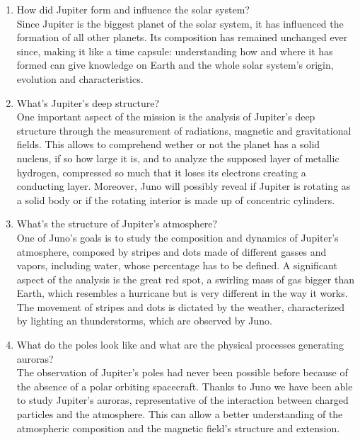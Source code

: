 \begin{enumerate}
    \item How did Jupiter form and influence the solar system? \\
    Since Jupiter is the biggest planet of the solar system, it has influenced the formation of all other planets. Its composition has remained unchanged ever since, making it like a time capsule: understanding how and where it has formed can give knowledge on Earth and the whole solar system’s origin, evolution and characteristics. \\

 
    \item What's Jupiter's deep structure?\\
    One important aspect of the mission is the analysis of Jupiter's deep structure through the measurement of radiations, magnetic and gravitational fields. This allows to comprehend wether or not the planet has a solid nucleus, if so how large it is, and to analyze the supposed layer of metallic hydrogen, compressed so much that it loses its electrons creating a conducting layer.  Moreover, Juno will possibly reveal if Jupiter is rotating as a solid body or if the rotating interior is made up of concentric cylinders.\\

    \item What's the structure of Jupiter's atmosphere?\\
    One of Juno's goals is to study the composition and dynamics of Jupiter's atmosphere, composed by stripes and dots made of different gasses and vapors, including water, whose percentage has to be defined. A significant aspect of the analysis is the great red spot, a swirling mass of gas bigger than Earth, which resembles a hurricane but is very different in the way it works. The movement of stripes and dots is dictated by the weather, characterized by lighting an thunderstorms, which are observed by Juno. \\

    \item What do the poles look like and what are the physical processes generating auroras?\\
    The observation of Jupiter's poles had never been possible before because of the absence of a polar orbiting spacecraft. Thanks to Juno we have been able to study Jupiter's auroras, representative of the interaction between charged particles and the atmosphere. This can allow a better understanding of the atmospheric composition and the magnetic field's structure and extension.\\




\end{enumerate}



